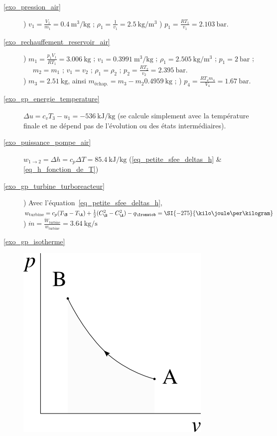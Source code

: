 \begin{description}
	\item [\ref{exo_pression_air}]
					) $v_1 = \frac{V_1}{m_1} = \SI{0,4}{\metre\cubed\per\kilogram}$ ; $\rho_1 = \frac{1}{v_1} = \SI{2,5}{\kilogram\per\metre\cubed}$
					) $p_1 = \frac{R T_1}{v_1} = \SI{2,103}{\bar}$.
	\item [\ref{exo_rechauffement_reservoir_air}]
					) $m_1 = \frac{p_1 V_1}{R T_1} = \SI{3,006}{\kilogram}$ ; $v_1 = \SI{0,3991}{\metre\cubed\per\kilogram}$ ; $\rho_1 = \SI{2,505}{\kilogram\per\metre\cubed}$ ; $p_1 = \SI{2}{\bar}$ ;
					\tab ~~ $m_2 = m_1$ ; $v_1 = v_2$ ; $\rho_1 = \rho_2$ ; $p_2 = \frac{R T_2}{v_2} = \SI{2,395}{\bar}$.\\
					) $m_3 = \SI{2,51}{\kilogram}$, ainsi $m_\text{échap.} = m_3 - m_2 \SI{0,4959}{\kilogram}$ ;
					) $p_4 = \frac{R T_4 m_4}{V_4} = \SI{1,67}{\bar}$.
	\item [\ref{exo_gp_energie_temperature}]
					\tab $\Delta u = c_v T_3 - u_1 = \SI{-536}{\kilo\joule\per\kilogram}$ (se calcule simplement avec la température finale et ne dépend pas de l’évolution ou des états intermédiaires).
	\item [\ref{exo_puissance_pompe_air}]
					\tab $w_{1\to 2} = \Delta h = c_p \Delta T = \SI{+85,4}{\kilo\joule\per\kilogram}$ (\ref{eq_petite_sfee_deltas_h} \& \ref{eq_h_fonction_de_T})
	\item [\ref{exo_gp_turbine_turboreacteur}]
					) Avec l’équation~\ref{eq_petite_sfee_deltas_h}, $w_\text{turbine} = c_p (T_\B - T_\A) + \frac{1}{2}(C_\B^2 - C_\A^2) - q_\fromatob = \SI{-275}{\kilo\joule\per\kilogram}$ 	
					) $\dot m = \frac{\dot W_\text{turbine}}{w_\text{turbine}} = \SI{3,64}{\kilogram\per\second}$
	\item [\ref{exo_gp_isotherme}]
					\includegraphics[width=\solutiondiagramwidth]{images/exo_sol_pv_isoth.png}

\end{description}
